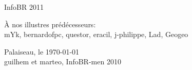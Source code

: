 \thispagestyle{empty}

\begin{center}
\begin{Huge}
InfoBR 2011
\end{Huge}
\end{center}


\begin{flushright}
\begin{large} 
 { \selectfont
\`A nos illustres pr\'ed\'ecesseurs:\\
\smallskip
mYk, bernardofpc, questor, eracil, j-philippe, Lad, Geogeo \\ }
\end{large}
\vspace{1cm}
{Palaiseau, le \today \\
\medskip
guilhem et marteo, InfoBR-men 2010  }
\end{flushright} 



\newpage
\thispagestyle{empty}
\vspace*{1cm}
\newpage
